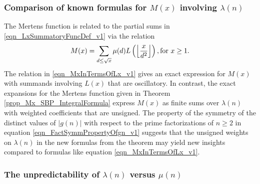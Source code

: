 \documentclass[11pt,reqno,a4letter]{article}
\newcommand{\hlocalref}[1]{\hyperref[#1]{\ref{#1}}}
\numberwithin{equation}{section}
\numberwithin{figure}{section}
\numberwithin{table}{section}
\newcommand{\Floor}[2]{\ensuremath{\left\lfloor \frac{#1}{#2} \right\rfloor}}
\theoremstyle{plain}
\numberwithin{theorem}{section}
\theoremstyle{definition}
\theoremstyle{remark}
\newcommand{\mathtext}[1]{\text{\rm #1}}
\begin{document}
\subsubsection{Comparison of known formulas for $M(x)$ involving $\lambda(n)$}

The Mertens function is related to the partial sums in 
\eqref{eqn_LxSummatoryFuncDef_v1} 
via the relation \cite{HUMPHRIES-JNT-2013,LEHMAN-1960} 
\begin{equation}
\label{eqn_MxInTermsOfLx_v1} 
M(x) = \sum_{d \leq \sqrt{x}} \mu(d) L\left(\Floor{x}{d^2}\right), \mathtext{ for } x \geq 1.
\end{equation}
The relation in \eqref{eqn_MxInTermsOfLx_v1} 
gives an exact expression for $M(x)$ with summands involving $L(x)$ that are oscillatory. 
In contrast, the exact expansions for the Mertens function given in 
Theorem \hlocalref{prop_Mx_SBP_IntegralFormula} 
express $M(x)$ as finite sums over $\lambda(n)$ with weighted coefficients that are unsigned. 
The property of the symmetry of the distinct values of $|g(n)|$ with respect to the 
prime factorizations of $n \geq 2$ in equation \eqref{eqn_FactSymmPropertyOfgn_v1} 
suggests that the unsigned weights on $\lambda(n)$ in 
the new formulas from the theorem may yield new insights compared to formulas like 
equation \eqref{eqn_MxInTermsOfLx_v1}. 

\subsubsection{The unpredictability of $\lambda(n)$ versus $\mu(n)$}
\end{document}
